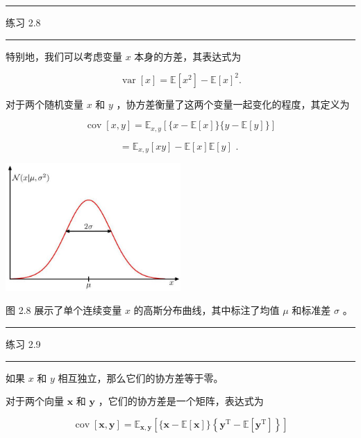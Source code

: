 \documentclass[10pt]{report}
\newcommand{\HRule}{\begin{center}\rule{0.9\linewidth}{0.2mm}\end{center}}
\begin{document}
\HRule

练习 2.8

\HRule

特别地，我们可以考虑变量 \(x\) 本身的方差，其表达式为

\[
\operatorname{var}\left\lbrack  x\right\rbrack   = \mathbb{E}\left\lbrack  {x}^{2}\right\rbrack   - \mathbb{E}{\left\lbrack  x\right\rbrack  }^{2}. \tag{2.46}
\]

对于两个随机变量 \(x\) 和 \(y\) ，协方差衡量了这两个变量一起变化的程度，其定义为

\[
\operatorname{cov}\left\lbrack  {x,y}\right\rbrack   = {\mathbb{E}}_{x,y}\left\lbrack  {\{ x - \mathbb{E}\left\lbrack  x\right\rbrack  \} \{ y - \mathbb{E}\left\lbrack  y\right\rbrack  \} }\right\rbrack
\]

\[
= {\mathbb{E}}_{x,y}\left\lbrack  {xy}\right\rbrack   - \mathbb{E}\left\lbrack  x\right\rbrack  \mathbb{E}\left\lbrack  y\right\rbrack  \text{ . } \tag{2.47}
\]

\begin{center}
\includegraphics[max width=0.5\textwidth]{images/0194e279-9b28-703a-88f4-c3ac21e2010d_55_884_344_669_490_0.jpg}
\end{center}
\hspace*{3em} 

图 2.8 展示了单个连续变量 \(x\) 的高斯分布曲线，其中标注了均值 \(\mu\) 和标准差 \(\sigma\) 。

\HRule

练习 2.9

\HRule

如果 \(x\) 和 \(y\) 相互独立，那么它们的协方差等于零。

对于两个向量 \(\mathbf{x}\) 和 \(\mathbf{y}\) ，它们的协方差是一个矩阵，表达式为

\[
\operatorname{cov}\left\lbrack  {\mathbf{x},\mathbf{y}}\right\rbrack   = {\mathbb{E}}_{\mathbf{x},\mathbf{y}}\left\lbrack  {\{ \mathbf{x} - \mathbb{E}\left\lbrack  \mathbf{x}\right\rbrack  \} \left\{  {{\mathbf{y}}^{\mathrm{T}} - \mathbb{E}\left\lbrack  {\mathbf{y}}^{\mathrm{T}}\right\rbrack  }\right\}  }\right\rbrack
\]
\end{document}

